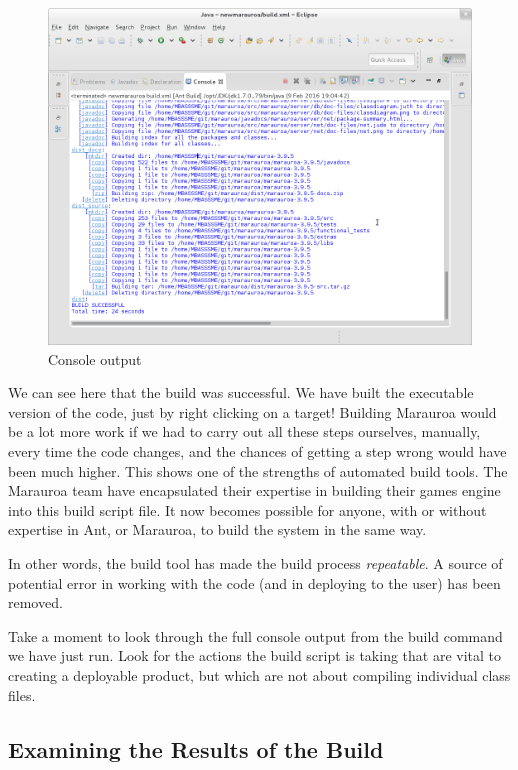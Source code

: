 \documentclass[
]{book}
\begin{document}
\begin{figure}

{\centering \includegraphics[width=1\linewidth]{images/2.2endConsoleOut} 

}

\caption{Console output}\label{fig:endconsoleOut-fig}
\end{figure}

We can see here that the build was successful. We have built the executable version of the code, just by right clicking on a target! Building Marauroa would be a lot more work if we had to carry out all these steps ourselves, manually, every time the code changes, and the chances of getting a step wrong would have been much higher. This shows one of the strengths of automated build tools. The Marauroa team have encapsulated their expertise in building their games engine into this build script file. It now becomes possible for anyone, with or without expertise in Ant, or Marauroa, to build the system in the same way.

In other words, the build tool has made the build process \emph{repeatable}. A source of potential error in working with the code (and in deploying to the user) has been removed.

Take a moment to look through the full console output from the build command we have just run. Look for the actions the build script is taking that are vital to creating a deployable product, but which are not about compiling individual class files.

\hypertarget{examining}{%
\subsection{Examining the Results of the Build}\label{examining}}
\end{document}

